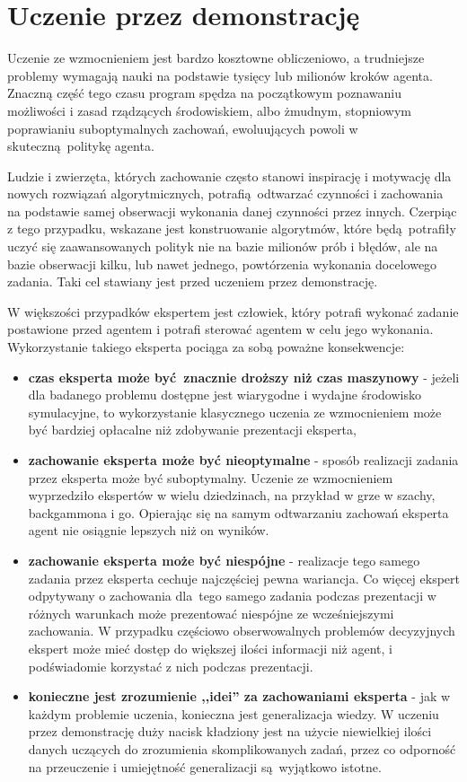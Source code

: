 \documentclass[polish,master,a4paper,oneside]{ppfcmthesis}
\begin{document}
 \section{Uczenie przez demonstrację}\label{imitation_learning}
Uczenie ze wzmocnieniem jest bardzo kosztowne obliczeniowo, a trudniejsze problemy wymagają nauki na podstawie tysięcy lub milionów kroków agenta. Znaczną część tego czasu program spędza na początkowym poznawaniu możliwości i zasad rządzących środowiskiem, albo żmudnym, stopniowym poprawianiu suboptymalnych zachowań, ewoluujących powoli w skuteczną politykę agenta.

Ludzie i zwierzęta, których zachowanie często stanowi inspirację i motywację dla nowych rozwiązań algorytmicznych, potrafią odtwarzać czynności i zachowania na podstawie samej obserwacji wykonania danej czynności przez innych. Czerpiąc z tego przypadku, wskazane jest konstruowanie algorytmów, które będą potrafiły uczyć się zaawansowanych polityk nie na bazie milionów prób i błędów, ale na bazie obserwacji kilku, lub nawet jednego, powtórzenia wykonania docelowego zadania. Taki cel stawiany jest przed uczeniem przez demonstrację.

W większości przypadków ekspertem jest człowiek, który potrafi wykonać zadanie postawione przed agentem i potrafi sterować agentem w celu jego wykonania. Wykorzystanie takiego eksperta pociąga za sobą poważne konsekwencje:
\begin{itemize}
\item \textbf{czas eksperta może być znacznie droższy niż czas maszynowy} - jeżeli dla badanego problemu dostępne jest wiarygodne i wydajne środowisko symulacyjne, to wykorzystanie klasycznego uczenia ze wzmocnieniem może być bardziej opłacalne niż zdobywanie prezentacji eksperta,
\item \textbf{zachowanie eksperta może być nieoptymalne} - sposób realizacji zadania przez eksperta może być suboptymalny. Uczenie ze wzmocnieniem wyprzedziło ekspertów w wielu dziedzinach, na przykład w grze w szachy, backgammona i go. Opierając się na samym odtwarzaniu zachowań eksperta agent nie osiągnie lepszych niż on wyników.
\item \textbf{zachowanie eksperta może być niespójne} - realizacje tego samego zadania przez eksperta cechuje najczęściej pewna wariancja. Co więcej ekspert odpytywany o zachowania dla tego samego zadania podczas prezentacji w różnych warunkach może prezentować niespójne ze wcześniejszymi zachowania. W przypadku częściowo obserwowalnych problemów decyzyjnych ekspert może mieć dostęp do większej ilości informacji niż agent, i podświadomie korzystać z nich podczas prezentacji.
\item  \textbf{konieczne jest zrozumienie ,,idei'' za zachowaniami eksperta} - jak w każdym problemie uczenia, konieczna jest generalizacja wiedzy. W uczeniu przez demonstrację duży nacisk kładziony jest na użycie niewielkiej ilości danych uczących do zrozumienia skomplikowanych zadań, przez co odporność na przeuczenie i umiejętność generalizacji są wyjątkowo istotne.
\end{itemize}   
\end{document}
